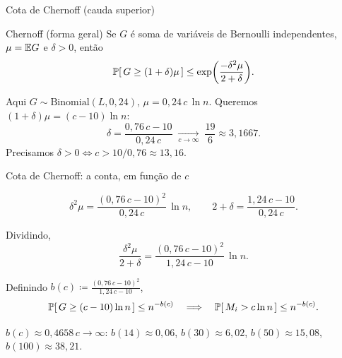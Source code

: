 \documentclass[aspectratio=169]{beamer}
\begin{document}

\begin{frame}{Cota de Chernoff (cauda superior)}
 
  \begin{block}{Chernoff (forma geral)}
    Se $G$ é soma de variáveis de Bernoulli independentes, $\mu=\mathbb{E}{G}$ e
    $\delta>0$, então
    \[
      \ProbE{G\geq(1+\delta)\mu}\leq
      \exp \paren*{\frac{-\delta^2 \mu}{2+\delta}}.
    \]
  \end{block}
 
  \vfill
 
  Aqui $G\sim\mathrm{Binomial}(L,0{,}24)$, $\mu=0{,}24\,c\,\ln n$.
  Queremos $(1+\delta)\mu=(c-10)\ln n$:
  \[
    \delta=\frac{0{,}76\,c-10}{0{,}24\,c}
    \;\xrightarrow[c\to\infty]{}\; \frac{19}{6}\approx3{,}1667.
  \]
  Precisamos $\delta>0 \Leftrightarrow c>10/0{,}76\approx13{,}16$.
 
\end{frame}
 
\begin{frame}{Cota de Chernoff: a conta, em função de $c$}
 
  \[
    \delta^2\mu
    =\frac{(0{,}76\,c-10)^2}{0{,}24\,c}\,\ln n,
    \qquad
    2+\delta = \frac{1{,}24\,c-10}{0{,}24\,c}.
  \]
 
  \vfill
 
  Dividindo,
  \[
    \frac{\delta^2\mu}{2+\delta}
    = \frac{(0{,}76\,c-10)^2}{1{,}24\,c-10}\,\ln n.
  \]
 
  \vfill
 
  Definindo $\displaystyle b(c)\coloneqq\frac{(0{,}76\,c-10)^2}{1{,}24\,c-10}$,
  \[
    \ProbE{G\geq(c-10)\ln n}\leq n^{-b(c)}
    \quad\Longrightarrow\quad
    \ProbE{M_i>c\ln n}\leq n^{-b(c)}.
  \]
 
  \vfill
  \small
   $b(c)\approx 0{,}4658\,c\to\infty$:
  $b(14)\approx0{,}06$, $b(30)\approx6{,}02$, $b(50)\approx15{,}08$,
  $b(100)\approx38{,}21$.
 
\end{frame}
 
\end{document}

